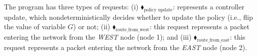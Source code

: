 %
The program has three types of requests:
%	
	(i)
	{\color{ForestGreen}$\blacklozenge_\text{policy update}$}:
 represents a controller  update, which nondeterministically decides whether to update the policy (i.e., flip the value of  variable $G$) or not;
%	
(ii)
	{\color{ForestGreen}$\blacklozenge_\text{route\_from\_west}$}:
	 this request represents a packet entering the network from the \textit{WEST} node (node 1); and 
%	
(iii)
{\color{ForestGreen}$\blacklozenge_\text{route\_from\_east}$}: this request represents a packet entering the network from the \textit{EAST} node (node 2).
%


